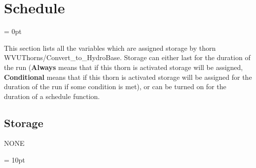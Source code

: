 
\section{Schedule} 


\parskip = 0pt


\noindent This section lists all the variables which are assigned storage by thorn WVUThorns/Convert\_to\_HydroBase.  Storage can either last for the duration of the run ({\bf Always} means that if this thorn is activated storage will be assigned, {\bf Conditional} means that if this thorn is activated storage will be assigned for the duration of the run if some condition is met), or can be turned on for the duration of a schedule function.


\subsection*{Storage}NONE

\vspace{5mm}\parskip = 10pt 
